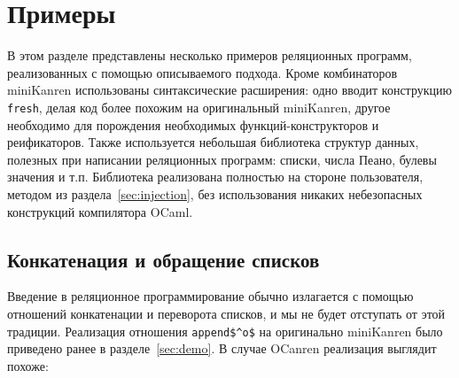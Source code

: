 
\section{Примеры}
\label{sec:examples}

В этом разделе представлены несколько примеров реляционных программ, реализованных с помощью описываемого подхода.
Кроме комбинаторов miniKanren использованы синтаксические расширения: одно вводит конструкцию \lstinline|fresh|, делая код более похожим на оригинальный miniKanren,
другое необходимо для порождения необходимых функций-конструкторов и реификаторов.
Также используется небольшая библиотека структур данных, полезных при написании реляционных программ: списки, числа Пеано, булевы значения и т.п.
Библиотека реализована полностью на стороне пользователя, методом из раздела~\ref{sec:injection}, без использования никаких небезопасных конструкций компилятора OCaml.



\subsection{Конкатенация и обращение списков}

Введение в реляционное программирование обычно излагается с помощью отношений конкатенации и переворота списков, и мы не будет отступать от этой традиции.
Реализация отношения  \lstinline|append$^o$| на оригинально miniKanren было приведено ранее в разделе~\ref{sec:demo}.
В случае OCanren реализация выглядит похоже:


